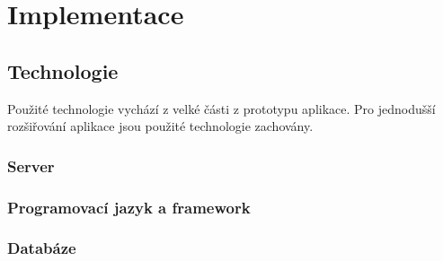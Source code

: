 \chapter{Implementace}

\section{Technologie}
Použité technologie vychází z velké části z prototypu aplikace. Pro jednodušší rozšiřování aplikace jsou použité technologie zachovány.

\subsection{Server}
\subsection{Programovací jazyk a framework}
\subsection{Databáze}
